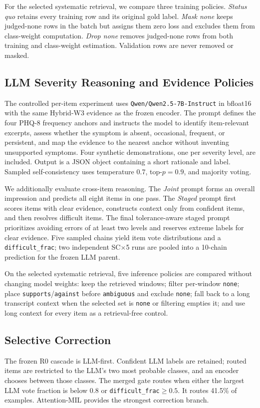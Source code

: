 \documentclass{article}
\begin{document}
For the selected systematic retrieval, we compare three training policies. \emph{Status quo} retains every training row and its original gold label. \emph{Mask none} keeps judged-none rows in the batch but assigns them zero loss and excludes them from class-weight computation. \emph{Drop none} removes judged-none rows from both training and class-weight estimation. Validation rows are never removed or masked.

\subsection{LLM Severity Reasoning and Evidence Policies}
\label{subsec:llm}
The controlled per-item experiment uses \texttt{Qwen/Qwen2.5-7B-Instruct} in bfloat16 with the same Hybrid-W3 evidence as the frozen encoder. The prompt defines the four PHQ-8 frequency anchors and instructs the model to identify item-relevant excerpts, assess whether the symptom is absent, occasional, frequent, or persistent, and map the evidence to the nearest anchor without inventing unsupported symptoms. Four synthetic demonstrations, one per severity level, are included. Output is a JSON object containing a short rationale and label. Sampled self-consistency uses temperature 0.7, top-$p=0.9$, and majority voting.

We additionally evaluate cross-item reasoning. The \emph{Joint} prompt forms an overall impression and predicts all eight items in one pass. The \emph{Staged} prompt first scores items with clear evidence, constructs context only from confident items, and then resolves difficult items. The final tolerance-aware staged prompt prioritizes avoiding errors of at least two levels and reserves extreme labels for clear evidence. Five sampled chains yield item vote distributions and a \texttt{difficult\_frac}; two independent SC$\times$5 runs are pooled into a 10-chain prediction for the frozen LLM parent.

On the selected systematic retrieval, five inference policies are compared without changing model weights: keep the retrieved windows; filter per-window \texttt{none}; place \texttt{supports}/\texttt{against} before \texttt{ambiguous} and exclude \texttt{none}; fall back to a long transcript context when the selected set is \texttt{none} or filtering empties it; and use long context for every item as a retrieval-free control.

\subsection{Selective Correction}
\label{subsec:cascade}
The frozen R0 cascade is LLM-first. Confident LLM labels are retained; routed items are restricted to the LLM's two most probable classes, and an encoder chooses between those classes. The merged gate routes when either the largest LLM vote fraction is below 0.8 or \texttt{difficult\_frac}$\geq0.5$. It routes 41.5\% of examples. Attention-MIL provides the strongest correction branch.
\end{document}
